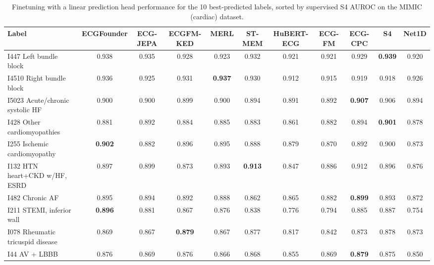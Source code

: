 \documentclass{article}
\begin{document}
                \begin{table}[htbp]
                    \centering
                    \tiny
                    \setlength{\tabcolsep}{2pt}
                    \caption{Finetuning with a linear prediction head performance for the 10 best-predicted labels, sorted by supervised S4 AUROC on the MIMIC (cardiac) dataset.}
                    \begin{tabular}{lcccccccccc}
                        \toprule
                        \textbf{Label} & \textbf{ECGFounder} & \textbf{ECG-JEPA} & \textbf{ECGFM-KED} & \textbf{MERL} & \textbf{ST-MEM} & \textbf{HuBERT-ECG} & \textbf{ECG-FM} & \textbf{ECG-CPC} & \textbf{S4} & \textbf{Net1D} \\
                        \midrule
                        I447 Left bundle block & 0.938 & 0.935 & 0.928 & 0.923 & 0.932 & 0.921 & 0.921 & 0.929 & \textbf{0.939} & 0.920 \\
                        I4510 Right bundle block & 0.936 & 0.925 & 0.931 & \textbf{0.937} & 0.930 & 0.912 & 0.915 & 0.919 & 0.918 & 0.926 \\
                        I5023 Acute/chronic systolic HF & 0.900 & 0.900 & 0.899 & 0.900 & 0.894 & 0.891 & 0.892 & \textbf{0.907} & 0.906 & 0.894 \\
                        I428 Other cardiomyopathies & 0.881 & 0.892 & 0.884 & 0.885 & 0.883 & 0.861 & 0.882 & 0.894 & \textbf{0.901} & 0.878 \\
                        I255 Ischemic cardiomyopathy & \textbf{0.902} & 0.882 & 0.896 & 0.895 & 0.888 & 0.879 & 0.870 & 0.892 & 0.900 & 0.873 \\
                        I132 HTN heart+CKD w/HF, ESRD & 0.897 & 0.899 & 0.873 & 0.893 & \textbf{0.913} & 0.847 & 0.886 & 0.912 & 0.896 & 0.876 \\
                        I482 Chronic AF & 0.895 & 0.894 & 0.892 & 0.888 & 0.862 & 0.865 & 0.882 & \textbf{0.899} & 0.893 & 0.872 \\
                        I211 STEMI, inferior wall & \textbf{0.896} & 0.881 & 0.867 & 0.876 & 0.838 & 0.776 & 0.794 & 0.885 & 0.887 & 0.754 \\
                        I078 Rheumatic tricuspid disease & 0.869 & 0.867 & \textbf{0.879} & 0.867 & 0.877 & 0.817 & 0.842 & 0.873 & 0.878 & 0.873 \\
                        I44 AV + LBBB & 0.876 & 0.869 & 0.876 & 0.866 & 0.868 & 0.855 & 0.869 & \textbf{0.879} & 0.875 & 0.850 \\
                        \bottomrule
                    \end{tabular}
                    \label{tab:results_overview_cardiac}
                \end{table}
                
\end{document}
